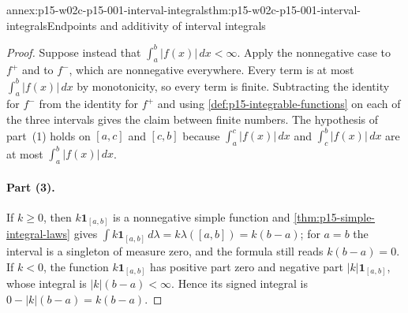 \begin{annexitem}{annex:p15-w02c-p15-001-interval-integrals}{thm:p15-w02c-p15-001-interval-integrals}{Endpoints and additivity of interval integrals}
\begin{proof}
Suppose instead that \(\int_a^b|f(x)|\,dx<\infty\). Apply the nonnegative
case to \(f^+\) and to \(f^-\), which are nonnegative everywhere. Every
term is at most \(\int_a^b|f(x)|\,dx\) by monotonicity, so every term is
finite. Subtracting the identity for \(f^-\) from the identity for
\(f^+\) and using \cref{def:p15-integrable-functions} on each of the three
intervals gives the claim between finite numbers. The hypothesis of
part~(1) holds on \([a,c]\) and \([c,b]\) because
\(\int_a^c|f(x)|\,dx\) and \(\int_c^b|f(x)|\,dx\) are at most
\(\int_a^b|f(x)|\,dx\).

\paragraph{Part (3).}
If \(k\geq0\), then \(k\mathbf1_{[a,b]}\) is a nonnegative simple
function and \cref{thm:p15-simple-integral-laws} gives
\(\int k\mathbf1_{[a,b]}\,d\lambda=k\lambda([a,b])=k(b-a)\); for
\(a=b\) the interval is a singleton of measure zero, and the formula
still reads \(k(b-a)=0\). If \(k<0\), the function
\(k\mathbf1_{[a,b]}\) has positive part zero and negative part
\(|k|\mathbf1_{[a,b]}\), whose integral is \(|k|(b-a)<\infty\). Hence
its signed integral is \(0-|k|(b-a)=k(b-a)\).
\end{proof}
\end{annexitem}

